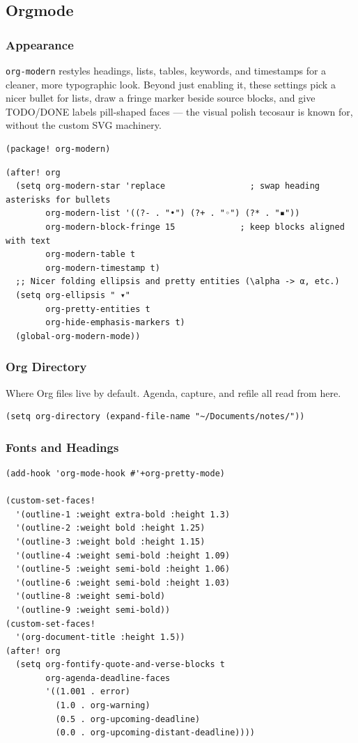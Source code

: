 \documentclass[11pt]{article}
\begin{document}
\subsection{Orgmode}
\label{sec:org3c0c647}
\subsubsection{Appearance}
\label{sec:org76a2c88}
\texttt{org-modern} restyles headings, lists, tables, keywords, and
timestamps for a cleaner, more typographic look. Beyond just enabling
it, these settings pick a nicer bullet for lists, draw a fringe marker
beside source blocks, and give TODO/DONE labels pill-shaped faces —
the visual polish tecosaur is known for, without the custom SVG
machinery.

\begin{verbatim}
(package! org-modern)
\end{verbatim}

\begin{verbatim}
(after! org
  (setq org-modern-star 'replace                 ; swap heading asterisks for bullets
        org-modern-list '((?- . "•") (?+ . "◦") (?* . "▪"))
        org-modern-block-fringe 15             ; keep blocks aligned with text
        org-modern-table t
        org-modern-timestamp t)
  ;; Nicer folding ellipsis and pretty entities (\alpha -> α, etc.)
  (setq org-ellipsis " ▾"
        org-pretty-entities t
        org-hide-emphasis-markers t)
  (global-org-modern-mode))
\end{verbatim}
\subsubsection{Org Directory}
\label{sec:orga0c9911}
Where Org files live by default. Agenda, capture, and refile all read
from here.

\begin{verbatim}
(setq org-directory (expand-file-name "~/Documents/notes/"))
\end{verbatim}
\subsubsection{Fonts and Headings}
\label{fonts-and-headings}
\begin{verbatim}
(add-hook 'org-mode-hook #'+org-pretty-mode)

(custom-set-faces!
  '(outline-1 :weight extra-bold :height 1.3)
  '(outline-2 :weight bold :height 1.25)
  '(outline-3 :weight bold :height 1.15)
  '(outline-4 :weight semi-bold :height 1.09)
  '(outline-5 :weight semi-bold :height 1.06)
  '(outline-6 :weight semi-bold :height 1.03)
  '(outline-8 :weight semi-bold)
  '(outline-9 :weight semi-bold))
(custom-set-faces!
  '(org-document-title :height 1.5))
(after! org
  (setq org-fontify-quote-and-verse-blocks t
        org-agenda-deadline-faces
        '((1.001 . error)
          (1.0 . org-warning)
          (0.5 . org-upcoming-deadline)
          (0.0 . org-upcoming-distant-deadline))))
\end{verbatim}
\end{document}
